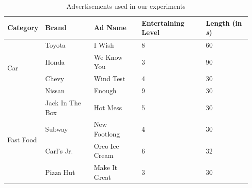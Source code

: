\documentclass[twoside,leqno,twocolumn]{article}
\begin{document}
\begin{table}[!t]
\caption{Advertisements used in our experiments} \label{table:ads}
\centering
\scriptsize
\begin{tabular}{lllll}
\toprule
Category & Brand & Ad Name & Entertaining Level & Length (in \textit{s}) \\ \midrule

\multirow{4}{*}{Car}        & Toyota & I Wish  & 8 & 60			\\ %
                            & Honda  & We Know You  & 3 & 90 \\ %
                            & Chevy  & Wind Test  & 4 & 30  \\ %
                            & Nissan & Enough   & 9 & 30    \\ %
\midrule 
\multirow{4}{*}{Fast Food} & Jack In The Box & Hot Mess               & 5 &  30 \\ %
                            & Subway                & New Footlong    & 4 & 30 \\ %
                            & Carl's Jr.            & Oreo Ice Cream  & 6 &  32 \\ %
                            & Pizza Hut             & Make It Great   & 3 & 30 \\ %
\bottomrule
\end{tabular}
\end{table} 
\end{document}

